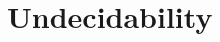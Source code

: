 \documentclass[open-logic-chapter]{subfiles}
\begin{document}
\chapter{Undecidability}






\end{document}
